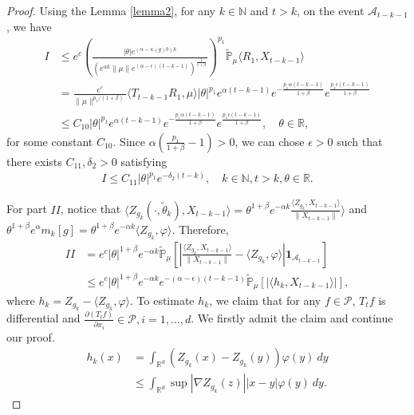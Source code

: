 \documentclass[12pt, a4paper]{amsart}
\theoremstyle{definition}
\numberwithin{equation}{section}
\begin{document}
\begin{proof}
    Using the Lemma \ref{lemma2}, for any $k\in \mathbb{N}$ and $t>k$, on the event $\mathcal{A}_{t-k-1}$, we have
    \begin{align*}
        I&\leq e^c\left(\frac{|\theta|e^{(\alpha-\kappa(g)b)k}}{(e^{\alpha k}\|\mu\|e^{(\alpha-\epsilon)(t-k-1)})^\frac{1}{1+\beta}}\right)^{p_1}\mathbb{\tilde{P}}_{\mu}\langle R_1,X_{t-k-1}\rangle\\
        &=\frac{e^c}{\|\mu\|^{p_1/(1+\beta)}}\langle T_{t-k-1} R_1,\mu\rangle|\theta|^{p_1}e^{\alpha(t-k-1)} e^{-\frac{p_1\alpha(t-k-1)}{1+\beta}}e^{\frac{p_1\epsilon(t-k-1)}{1+\beta}}\\
        &\leq C_{10} |\theta|^{p_1} e^{\alpha(t-k-1)}e^{-\frac{p_1\alpha(t-k-1)}{1+\beta}}e^{\frac{p_1\epsilon(t-k-1)}{1+\beta}},\quad \theta\in \mathbb{R},
    \end{align*}
    for some constant $C_{10}$. Since $\alpha(\frac{p_1}{1+\beta}-1)>0$, we can chose $\epsilon>0$ such that there exists $C_{11},\delta_2>0$ satisfying
    \begin{align}
        I\leq C_{11}|\theta|^{p_1} e^{-\delta_2(t-k)}, \quad k\in \mathbb{N}, t>k, \theta \in \mathbb{R}.\label{lemma31q}
    \end{align}

    For part $II$, notice that $\langle Z_{g_k}(\cdot,\tilde{\theta}_k),X_{t-k-1}\rangle=\theta^{1+\beta}e^{-\alpha k}\frac{\langle Z_{g_k},X_{t-k-1}\rangle}{\|X_{t-k-1}\|} \rangle$ and $\theta^{1+\beta}e^{\alpha}m_k[g]=\theta^{1+\beta}e^{-\alpha k}\langle Z_{g_k},\varphi\rangle$. Therefore,
\begin{align}
    II&=e^c|\theta|^{1+\beta}e^{-\alpha k}\mathbb{\tilde{P}}_{\mu}\left[\left|\frac{\langle Z_{g_k},X_{t-k-1}\rangle}{\|X_{t-k-1}\|}-\langle Z_{g_k},\varphi\rangle\right|\mathbf{1}_{\mathcal{A}_{t-k-1}}\right]\nonumber\\
    &\leq e^c|\theta|^{1+\beta}e^{-\alpha k}e^{-(\alpha-\epsilon)(t-k-1)}\mathbb{\tilde{P}}_{\mu}\left[\left|\langle h_k,X_{t-k-1}\rangle\right|\right],\label{II1}
\end{align}
    where $h_k=Z_{g_k}-\langle Z_{g_k}, \varphi\rangle$. To estimate $h_k$, we claim that for any $f \in \mathcal{P}$, $T_t f$ is differential and $\frac{\partial (T_t f)}{\partial x_i} \in \mathcal{P}, i=1,...,d$. We firstly admit the claim and continue our proof.
    \begin{align*}
        h_k(x)&=\int_{\mathbb{R}^d}(Z_{g_k}(x)-Z_{g_k}(y))\varphi(y)~dy\\
        &\leq\int_{\mathbb{R}^d} \sup|\nabla Z_{g_k}(z)||x-y|\varphi(y)~dy.
    \end{align*}


\end{proof}
\end{document}
